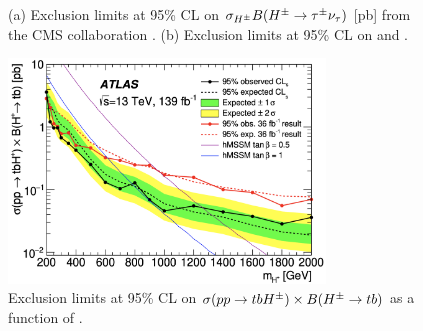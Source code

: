 		\begin{figure}[!ht]
			\centering
			\caption{\label{fig:hpm-taunu-cms-limits} (a) Exclusion limits at 95\% CL on $\sigma_{H^{\pm}} B(H^{\pm} \to \tau^\pm \nu_{\tau})$ [pb] from the CMS collaboration \cite{CMS-taunu}. (b) Exclusion limits at 95\% CL on \tanb and \mHpm \cite{CMS-taunu}. }
		\end{figure}

		\begin{figure}[!ht]
			\centering
			\includegraphics[width=0.75\textwidth]{chapters/chapter2_theory/images/HPlus_to_tb_Limits.png}
			\caption{\label{fig:hpm-tb-limits} Exclusion limits at 95\% CL on $\sigma (pp \to tbH^{\pm}) \times B(H^{\pm} \to tb)$ as a function of \mHpm \cite{Hpm-to-tb}. }
		\end{figure}

